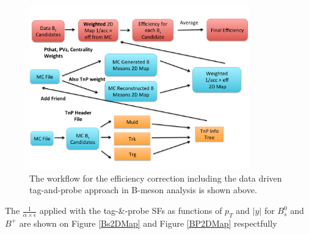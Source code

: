 \begin{figure}[h]
\begin{center}
\includegraphics[width= 0.85\textwidth]{Figures/Chapter5/EffCorrMethod.pdf}
\caption{The workflow for the efficiency correction including the data driven tag-and-probe approach in B-meson analysis is shown above.}
\label{EffWorkFlow}
\end{center}
\end{figure}

The $\frac{1}{\alpha \times \epsilon}$ applied with the tag-\&-probe SFs as functions of $p_T$ and $|y|$ for $B^0_s$ and $B^+$ are shown on Figure \ref{Bs2DMap} and Figure \ref{BP2DMap} respectfully 

